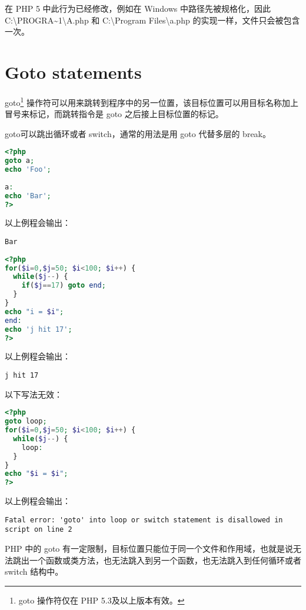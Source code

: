 在 PHP 5 中此行为已经修改，例如在 Windows 中路径先被规格化，因此 C:\textbackslash PROGRA\~{}1\textbackslash A.php 和 C:\textbackslash Program Files\textbackslash a.php 的实现一样，文件只会被包含一次。


\section{Goto statements}

goto\footnote{goto 操作符仅在 PHP 5.3及以上版本有效。} 操作符可以用来跳转到程序中的另一位置，该目标位置可以用目标名称加上冒号来标记，而跳转指令是 goto 之后接上目标位置的标记。



goto可以跳出循环或者 switch，通常的用法是用 goto 代替多层的 break。



\begin{lstlisting}[language=PHP]
<?php
goto a;
echo 'Foo';
 
a:
echo 'Bar';
?>
\end{lstlisting}

以上例程会输出：

\begin{verbatim}
Bar
\end{verbatim}

\begin{lstlisting}[language=PHP]
<?php
for($i=0,$j=50; $i<100; $i++) {
  while($j--) {
    if($j==17) goto end; 
  }  
}
echo "i = $i";
end:
echo 'j hit 17';
?>
\end{lstlisting}

以上例程会输出：

\begin{verbatim}
j hit 17
\end{verbatim}

以下写法无效：

\begin{lstlisting}[language=PHP]
<?php
goto loop;
for($i=0,$j=50; $i<100; $i++) {
  while($j--) {
    loop:
  }
}
echo "$i = $i";
?>
\end{lstlisting}

以上例程会输出：

\begin{verbatim}
Fatal error: 'goto' into loop or switch statement is disallowed in
script on line 2
\end{verbatim}

PHP 中的 goto 有一定限制，目标位置只能位于同一个文件和作用域，也就是说无法跳出一个函数或类方法，也无法跳入到另一个函数，也无法跳入到任何循环或者 switch 结构中。


